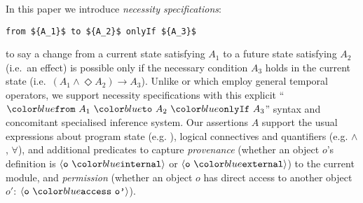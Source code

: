 In this paper we introduce
%
%
\textit{necessity specifications}:
%
%
%
%
\begin{lstlisting}[mathescape=true, language=chainmail, frame=lines]
from ${A_1}$ to ${A_2}$ onlyIf ${A_3}$ 
\end{lstlisting}
%
to say a change from a current state satisfying $A_1$ to a future
state satisfying $A_2$ (i.e.\ an effect) is possible only if the necessary condition
$A_3$ holds in the current state
%
(i.e.\ $(A_1 \wedge \Diamond A_2) \longrightarrow A_3$).
%
Unlike \citeauthor{VerX} or \citeauthor{FASE}
which employ general temporal operators, 
we support necessity specifications with this explicit
%
``$\onlyIf {A_1} {A_2} {A_3}$'' syntax
%
and concomitant specialised inference system.
%
%
Our assertions $A$ support the usual expressions about program state
(e.g. ), logical connectives and quantifiers
(e.g. $\wedge$, $\forall$), and additional predicates
to capture \textit{provenance} (whether an object $o$'s definition is
$\internal{\texttt{o}}$ or $\external{\texttt{o}}$) to the current
module, and \textit{permission} \cite{miller-esop2013} (whether an
object $o$ has direct access to another object $o'$:
$\access{\texttt{o}}{\texttt{o'}}$).
 

  
